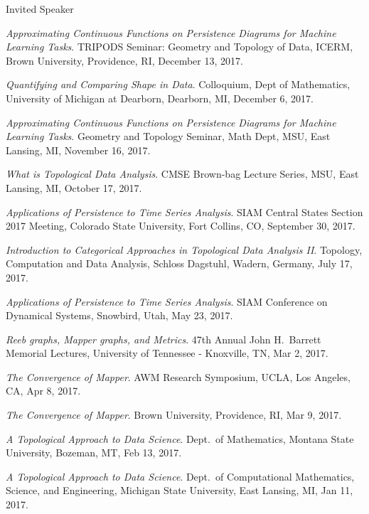 \documentclass{resume} %
\begin{document}
\begin{rSection}{Invited Speaker}
\begin{etaremune}
\item\emph{Approximating Continuous Functions on Persistence Diagrams for Machine Learning Tasks}. TRIPODS Seminar: Geometry and Topology of Data, ICERM, Brown University, Providence, RI, December 13, 2017. 

\item\emph{Quantifying and Comparing Shape in Data}. Colloquium, Dept of Mathematics, University of Michigan at Dearborn, Dearborn, MI, December 6, 2017. 

\item\emph{Approximating Continuous Functions on Persistence Diagrams for Machine Learning Tasks}. Geometry and Topology Seminar, Math Dept, MSU, East Lansing, MI, November 16, 2017. 

\item\emph{What is Topological Data Analysis}. CMSE Brown-bag Lecture Series, MSU, East Lansing, MI, October 17, 2017. 

\item\emph{Applications of Persistence to Time Series Analysis}. SIAM Central States Section 2017 Meeting, Colorado State University, Fort Collins, CO, September 30, 2017. 

\item\emph{Introduction to Categorical Approaches in Topological Data Analysis II}. Topology, Computation and Data Analysis, Schloss Dagstuhl, Wadern, Germany, July 17, 2017. 

\item\emph{Applications of Persistence to Time Series Analysis}. SIAM Conference on Dynamical Systems, Snowbird, Utah, May 23, 2017. 

\item\emph{Reeb graphs, Mapper graphs, and Metrics}. 47th Annual John H.~Barrett Memorial Lectures, University of Tennessee - Knoxville, TN, Mar 2, 2017. 

\item\emph{The Convergence of Mapper}. AWM Research Symposium, UCLA, Los Angeles, CA, Apr 8, 2017. 

\item\emph{The Convergence of Mapper}. Brown University, Providence, RI, Mar 9, 2017. 

\item\emph{A Topological Approach to Data Science}. Dept.~of Mathematics, Montana State University, Bozeman, MT, Feb 13, 2017. 

\item\emph{A Topological Approach to Data Science}. Dept.~of Computational Mathematics, Science, and Engineering, Michigan State University, East Lansing, MI, Jan 11, 2017. 


\end{etaremune}
\end{rSection}
\end{document}
